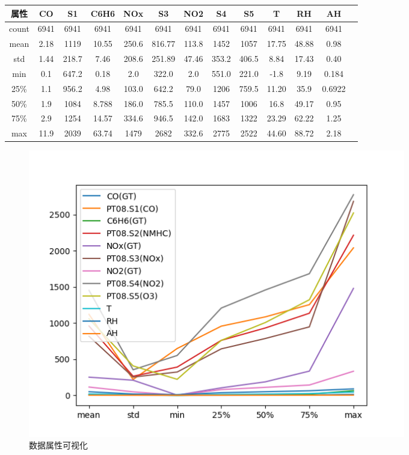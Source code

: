 \documentclass{ctexart}
\begin{document}
\begin{tabular}{|c|c|c|c|c|c|c|c|c|c|c|c|c}
\hline
属性&CO&S1&C6H6&NOx&S3&NO2&S4&S5&T&RH&AH \\
\hline
count&6941&6941&6941&6941&6941&6941&6941&6941&6941&6941&6941 \\
\hline
mean&2.18&1119&10.55&250.6&816.77&113.8&1452&1057&17.75&48.88&0.98\\
\hline
std&1.44&218.7&7.46&208.6&251.89&47.46&353.2&406.5&8.84&17.43&0.40\\
\hline
min&0.1&647.2&0.18&2.0&322.0&2.0&551.0&221.0&-1.8&9.19&0.184\\
\hline
25\%&1.1&956.2&4.98&103.0&642.2&79.0&1206&759.5&11.20&35.9&0.6922\\
\hline
50\%&1.9&1084&8.788&186.0&785.5&110.0&1457&1006&16.8&49.17&0.95\\
\hline
75\%&2.9&1254&14.57&334.6&946.5&142.0&1683&1322&23.29&62.22&1.25\\
\hline
max&11.9&2039&63.74&1479&2682&332.6&2775&2522&44.60&88.72&2.18\\
\hline
\end{tabular}

\begin{figure}[H]
	\centering
	\includegraphics[width=0.8\textwidth]{../images/data.png}
	\caption{数据属性可视化}
\end{figure}

\end{document}

